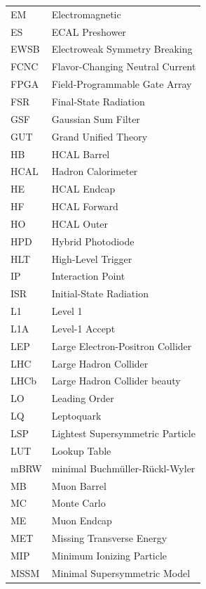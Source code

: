 \documentclass[12pt]{thesis}  %
\begin{document}
\begin{longtable}[l]{@{}l@{\ \ \ \ \ \ \ \ \ \ \ \ }l}
EM         & Electromagnetic \\
ES         & ECAL Preshower \\
EWSB       & Electroweak Symmetry Breaking \\
FCNC       & Flavor-Changing Neutral Current \\
FPGA       & Field-Programmable Gate Array \\
FSR        & Final-State Radiation \\
GSF        & Gaussian Sum Filter \\
GUT        & Grand Unified Theory \\
HB         & HCAL Barrel \\
HCAL       & Hadron Calorimeter \\
HE         & HCAL Endcap \\
HF         & HCAL Forward \\
HO         & HCAL Outer \\
HPD        & Hybrid Photodiode \\
HLT        & High-Level Trigger \\
IP         & Interaction Point \\
ISR        & Initial-State Radiation \\
L1         & Level 1 \\
L1A        & Level-1 Accept \\
LEP        & Large Electron-Positron Collider \\
LHC        & Large Hadron Collider \\
LHCb       & Large Hadron Collider beauty \\
LO         & Leading Order \\
LQ         & Leptoquark \\
LSP        & Lightest Supersymmetric Particle \\
LUT        & Lookup Table \\
mBRW       & minimal Buchm\"{u}ller-R\"{u}ckl-Wyler \\
MB         & Muon Barrel \\
MC         & Monte Carlo \\
ME         & Muon Endcap \\
MET        & Missing Transverse Energy \\
MIP        & Minimum Ionizing Particle \\
MSSM       & Minimal Supersymmetric Model \\

\end{longtable}
\end{document}
